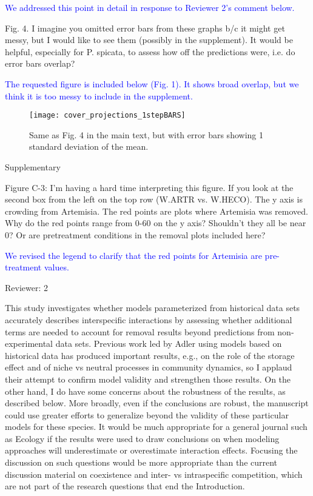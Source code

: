 \documentclass[12pt]{article}
\newcommand{\response}{\textcolor{blue}}
\begin{document}
\response{We addressed this point in detail in response to Reviewer 2's comment below.}

Fig. 4. I imagine you omitted error bars from these graphs b/c it might get messy, but I would like to see them (possibly in the supplement). It would be helpful, especially for P. spicata, to assess how off the predictions were, i.e. do error bars overlap?

\response{The requested figure is included below (Fig. 1). It shows broad overlap, but we think it is too messy to include in the supplement. }

 \begin{figure}[tbp]
 \centering
 \texttt{[image: cover\_projections\_1stepBARS]}
 \caption{ Same as Fig. 4 in the main text, but with error bars showing 1 standard deviation of the mean. }
 \label{fig:projectionsBars}
 \end{figure}

Supplementary

Figure C-3: I’m having a hard time interpreting this figure. If you look at the second box from the left on the top row (W.ARTR vs. W.HECO). The y axis is crowding from Artemisia. The red points are plots where Artemisia was removed. Why do the red points range from 0-60 on the y axis? Shouldn't they all be near 0? Or are pretreatment conditions in the removal plots included here? 

\response{We revised the legend to clarify that the red points for Artemisia are pre-treatment values.}

Reviewer: 2

This study investigates whether models parameterized from historical data sets accurately describes
interspecific interactions by assessing whether additional terms are needed to account for removal
results beyond predictions from non-experimental data sets. Previous work led by Adler using models
based on historical data has produced important results, e.g., on the role of the storage effect and of
niche vs neutral processes in community dynamics, so I applaud their attempt to confirm model validity
and strengthen those results. On the other hand, I do have some concerns about the robustness of the
results, as described below. More broadly, even if the conclusions are robust, the manuscript could use
greater efforts to generalize beyond the validity of these particular models for these species. It would
be much appropriate for a general journal such as Ecology if the results were used to draw conclusions
on when modeling approaches will underestimate or overestimate interaction effects. Focusing the
discussion on such questions would be more appropriate than the current discussion material on
coexistence and inter- vs intraspecific competition, which are not part of the research questions that
end the Introduction.
\end{document}
